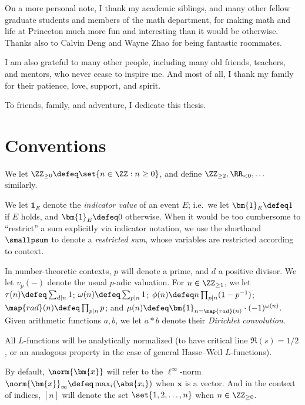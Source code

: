 \documentclass[12pt]{report}
\begin{document}
On a more personal note, I thank my academic siblings, and many other fellow graduate students and members of the math department, for making math and life at Princeton much more fun and interesting than it would be otherwise.
Thanks also to Calvin Deng and Wayne Zhao for being fantastic roommates.

I am also grateful to many other people, including many old friends, teachers, and mentors, who never cease to inspire me.
And most of all, I thank my family for their patience, love, support, and spirit.

To friends, family, and adventure, I dedicate this thesis.

\section*{Conventions}

We let $\ZZ_{\geq 0}\defeq \set{n\in \ZZ: n\geq 0}$, and define $\ZZ_{\geq 2}, \RR_{<0}, \dots$ similarly.

We let $\bm{1}_E$ denote the \emph{indicator value} of an event $E$;
i.e.~we let $\bm{1}_E\defeq 1$ if $E$ holds, and $\bm{1}_E\defeq 0$ otherwise.
When it would be too cumbersome to ``restrict'' a sum explicitly via indicator notation, we use the shorthand $\smallpsum$ to denote a \emph{restricted sum}, whose variables are restricted according to context.

In number-theoretic contexts, $p$ will denote a prime, and $d$ a positive divisor.
We let $v_p(-)$ denote the usual $p$-adic valuation.
For $n\in \ZZ_{\geq 1}$,
we let $\tau(n)\defeq \sum_{d\mid n} 1$;
$\omega(n)\defeq \sum_{p\mid n} 1$;
$\phi(n)\defeq n\prod_{p\mid n}(1-p^{-1})$;
$\map{rad}(n)\defeq \prod_{p\mid n} p$;
and $\mu(n)\defeq \bm{1}_{n=\map{rad}(n)}\cdot (-1)^{\omega(n)}$.
Given arithmetic functions $a,b$, we let $a\ast b$ denote their \emph{Dirichlet convolution}.

All $L$-functions will be analytically normalized
(to have critical line $\Re(s)=1/2$, or an analogous property in the case of general Hasse--Weil $L$-functions).

By default, $\norm{\bm{x}}$ will refer to the $\ell^\infty$-norm $\norm{\bm{x}}_\infty\defeq \max_{i}(\abs{x_i})$ when $\bm{x}$ is a vector.
And in the context of indices,
$[n]$ will denote the set $\set{1,2,\dots,n}$ when $n\in\ZZ_{\geq0}$.
\end{document}
